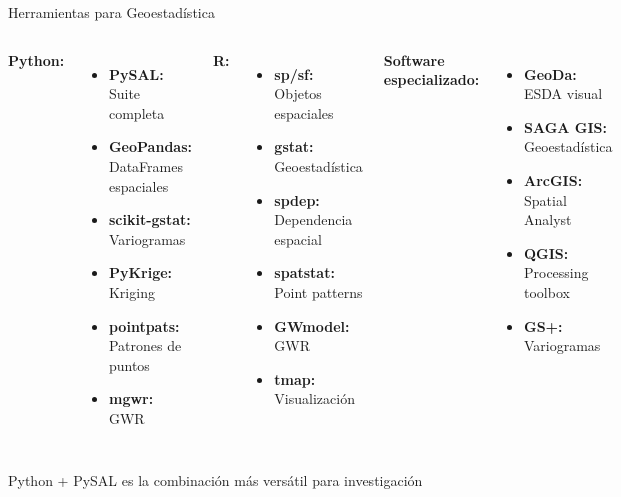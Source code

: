\documentclass[10pt,aspectratio=169]{beamer}
\newcommand{\tipbox}[1]{
\begin{tcolorbox}[colframe=green!70,colback=green!5]
\centering\faLightbulb\space #1
\end{tcolorbox}
}
\begin{document}
\begin{frame}{Herramientas para Geoestadística}
    \begin{columns}[T]
        \textbf{Python:}
        \begin{itemize}
            \item \textbf{PySAL:} Suite completa
            \item \textbf{GeoPandas:} DataFrames espaciales
            \item \textbf{scikit-gstat:} Variogramas
            \item \textbf{PyKrige:} Kriging
            \item \textbf{pointpats:} Patrones de puntos
            \item \textbf{mgwr:} GWR
        \end{itemize}
        
        \textbf{R:}
        \begin{itemize}
            \item \textbf{sp/sf:} Objetos espaciales
            \item \textbf{gstat:} Geoestadística
            \item \textbf{spdep:} Dependencia espacial
            \item \textbf{spatstat:} Point patterns
            \item \textbf{GWmodel:} GWR
            \item \textbf{tmap:} Visualización
        \end{itemize}
        
        \textbf{Software especializado:}
        \begin{itemize}
            \item \textbf{GeoDa:} ESDA visual
            \item \textbf{SAGA GIS:} Geoestadística
            \item \textbf{ArcGIS:} Spatial Analyst
            \item \textbf{QGIS:} Processing toolbox
            \item \textbf{GS+:} Variogramas
        \end{itemize}
    \end{columns}
    
    \vspace{0.5cm}
    \tipbox{Python + PySAL es la combinación más versátil para investigación}
\end{frame}
\end{document}
